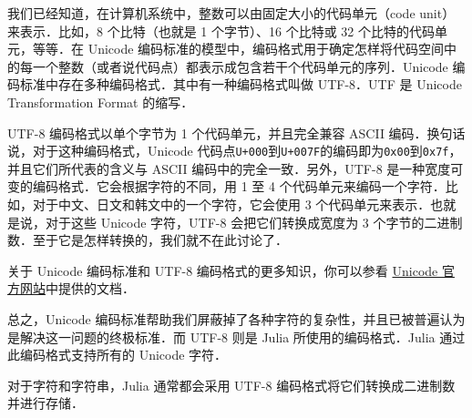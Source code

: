 我们已经知道，在计算机系统中，整数可以由固定大小的代码单元（code unit）来表示．比如，8 个比特（也就是 1 个字节）、16 个比特或 32 个比特的代码单元，等等．在 Unicode 编码标准的模型中，编码格式用于确定怎样将代码空间中的每一个整数（或者说代码点）都表示成包含若干个代码单元的序列．Unicode 编码标准中存在多种编码格式．其中有一种编码格式叫做 UTF-8．UTF 是 Unicode Transformation Format 的缩写．

UTF-8 编码格式以单个字节为 1 个代码单元，并且完全兼容 ASCII 编码．换句话说，对于这种编码格式，Unicode 代码点\verb|U+000|到\verb|U+007F|的编码即为\verb|0x00|到\verb|0x7f|，并且它们所代表的含义与 ASCII 编码中的完全一致．另外，UTF-8 是一种宽度可变的编码格式．它会根据字符的不同，用 1 至 4 个代码单元来编码一个字符．比如，对于中文、日文和韩文中的一个字符，它会使用 3 个代码单元来表示．也就是说，对于这些 Unicode 字符，UTF-8 会把它们转换成宽度为 3 个字节的二进制数．至于它是怎样转换的，我们就不在此讨论了．

关于 Unicode 编码标准和 UTF-8 编码格式的更多知识，你可以参看 \href{http://www.unicode.org}{Unicode 官方网站}中提供的文档．

总之，Unicode 编码标准帮助我们屏蔽掉了各种字符的复杂性，并且已被普遍认为是解决这一问题的终极标准．而 UTF-8 则是 Julia 所使用的编码格式．Julia 通过此编码格式支持所有的 Unicode 字符．

对于字符和字符串，Julia 通常都会采用 UTF-8 编码格式将它们转换成二进制数并进行存储．